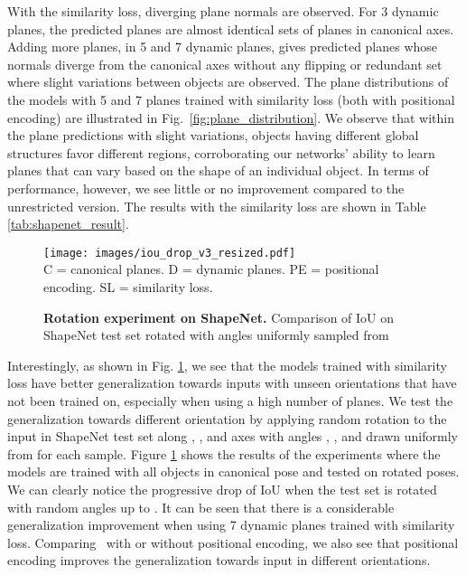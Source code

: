\documentclass[10pt,twocolumn,letterpaper]{article}
\begin{document}
With the similarity loss, diverging plane normals are observed. For 3 dynamic planes, the predicted planes are almost identical sets of planes in canonical axes. Adding more planes, \eg in 5 and 7 dynamic planes, gives predicted planes whose normals diverge from the canonical axes without any flipping or redundant set where slight variations between objects are observed. The plane distributions of the models with 5 and 7 planes trained with similarity loss (both with positional encoding) are illustrated in Fig.~\ref{fig:plane_distribution}. We observe that within the plane predictions with slight variations, objects having different global structures favor different regions, corroborating our networks' ability to learn planes that can vary based on the shape of an individual object. In terms of performance, however, we see little or no improvement compared to the unrestricted version. The results with the similarity loss are shown in Table \ref{tab:shapenet_result}.

\begin{figure}[!h]
\centering
\texttt{[image: images/iou\_drop\_v3\_resized.pdf]}\\
\footnotesize{C = canonical planes. D = dynamic planes. PE = positional encoding. SL = similarity loss.}
\caption{\textbf{Rotation experiment on ShapeNet.} Comparison of IoU on ShapeNet test set rotated with angles uniformly sampled from  }
\label{fig:iou_drop}
\end{figure}

Interestingly, as shown in Fig. \ref{fig:iou_drop}, we see that the models trained with similarity loss have better generalization towards inputs with unseen orientations that have not been trained on, especially when using a high number of planes. We test the generalization towards different orientation by applying random rotation to the input in ShapeNet test set along , , and  axes with angles , , and  drawn uniformly from  for each sample. Figure \ref{fig:iou_drop} shows the results of the experiments where the models are trained with all objects in canonical pose and tested on rotated poses. We can clearly notice the progressive drop of IoU when the test set is rotated with random angles up to . It can be seen that there is a considerable generalization improvement when using 7 dynamic planes trained with similarity loss. Comparing~\cite{peng2020convolutional} with or without positional encoding, we also see that positional encoding improves the generalization towards input in different orientations.
\end{document}
